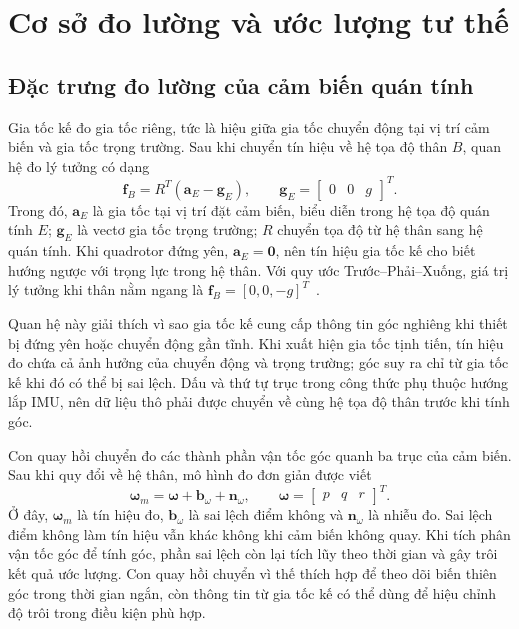 \section{Cơ sở đo lường và ước lượng tư thế}
\label{sec:background-estimation}

\subsection{Đặc trưng đo lường của cảm biến quán tính}
\label{subsec:background-imu}

Gia tốc kế đo gia tốc riêng, tức là hiệu giữa gia tốc chuyển động tại vị trí cảm biến và gia tốc trọng trường. Sau khi chuyển tín hiệu về hệ tọa độ thân $B$, quan hệ đo lý tưởng có dạng
\begin{equation}
    \mathbf f_B=R^T\left(\mathbf a_E-\mathbf g_E\right),
    \qquad
    \mathbf g_E=\begin{bmatrix}0&0&g\end{bmatrix}^T.
    \label{eq:background-specific-force}
\end{equation}
Trong đó, $\mathbf a_E$ là gia tốc tại vị trí đặt cảm biến, biểu diễn trong hệ tọa độ quán tính $E$; $\mathbf g_E$ là vectơ gia tốc trọng trường; $R$ chuyển tọa độ từ hệ thân sang hệ quán tính. Khi quadrotor đứng yên, $\mathbf a_E=\mathbf 0$, nên tín hiệu gia tốc kế cho biết hướng ngược với trọng lực trong hệ thân. Với quy ước Trước--Phải--Xuống, giá trị lý tưởng khi thân nằm ngang là $\mathbf f_B=[0,0,-g]^T$~\cite{nxp2013tilt}.

Quan hệ này giải thích vì sao gia tốc kế cung cấp thông tin góc nghiêng khi thiết bị đứng yên hoặc chuyển động gần tĩnh. Khi xuất hiện gia tốc tịnh tiến, tín hiệu đo chứa cả ảnh hưởng của chuyển động và trọng trường; góc suy ra chỉ từ gia tốc kế khi đó có thể bị sai lệch. Dấu và thứ tự trục trong công thức phụ thuộc hướng lắp IMU, nên dữ liệu thô phải được chuyển về cùng hệ tọa độ thân trước khi tính góc.

Con quay hồi chuyển đo các thành phần vận tốc góc quanh ba trục của cảm biến. Sau khi quy đổi về hệ thân, mô hình đo đơn giản được viết
\begin{equation}
    \symbf\omega_m
    =\symbf\omega+\mathbf b_\omega+\mathbf n_\omega,
    \qquad
    \symbf\omega=\begin{bmatrix}p&q&r\end{bmatrix}^T.
    \label{eq:background-gyro-measurement}
\end{equation}
Ở đây, $\symbf\omega_m$ là tín hiệu đo, $\mathbf b_\omega$ là sai lệch điểm không và $\mathbf n_\omega$ là nhiễu đo. Sai lệch điểm không làm tín hiệu vẫn khác không khi cảm biến không quay. Khi tích phân vận tốc góc để tính góc, phần sai lệch còn lại tích lũy theo thời gian và gây trôi kết quả ước lượng. Con quay hồi chuyển vì thế thích hợp để theo dõi biến thiên góc trong thời gian ngắn, còn thông tin từ gia tốc kế có thể dùng để hiệu chỉnh độ trôi trong điều kiện phù hợp.

